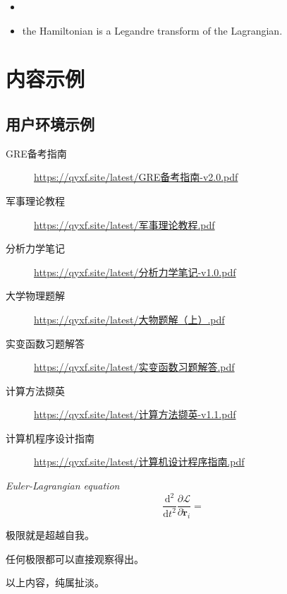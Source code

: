 \documentclass[
  10pt,
  twoside,
  openany,
  b5paper, %
  colorscheme = bootstrap-v4, %
]{qyxf-book}
\numberwithin{equation}{section}
\newcommand{\md}{\mathrm{d}}
\newcommand{\dd}[2]{\dfrac{\md^2 #1}{\md #2^2}}
\newcommand{\p}[2]{\dfrac{\partial #1}{\partial #2}}
\newcommand{\vr}{\boldsymbol{r}}
\newcommand{\dvr}{\dot{\vr}}
\newcommand{\lag}{\mathcal{L}} %
\begin{document}
\begin{itemize}
	\item 
	\item the Hamiltonian is a Legandre transform of the Lagrangian.
\end{itemize}








\chapter{内容示例}
\section{用户环境示例}

\begin{tcolorbox}
	\begin{description}
		\item [GRE备考指南] \url{https://qyxf.site/latest/GRE备考指南-v2.0.pdf}
		\item [军事理论教程] \url{https://qyxf.site/latest/军事理论教程.pdf}
		\item [分析力学笔记] \url{https://qyxf.site/latest/分析力学笔记-v1.0.pdf}
		\item [大学物理题解] \url{https://qyxf.site/latest/大物题解（上）.pdf}
		\item [实变函数习题解答] \url{https://qyxf.site/latest/实变函数习题解答.pdf}
		\item [计算方法撷英] \url{https://qyxf.site/latest/计算方法撷英-v1.1.pdf}
		\item [计算机程序设计指南] \url{https://qyxf.site/latest/计算机设计程序指南.pdf}
	\end{description}
\end{tcolorbox}

\begin{pequation}
	\textit{Euler-Lagrangian equation}
	$$
	\dd{}{t}\p{\lag}{\dvr_i}=
	$$
\end{pequation}

\begin{define}
  极限就是超越自我。
\end{define}

\begin{theorem}
  任何极限都可以直接观察得出。
\end{theorem}

\begin{lemma}
  以上内容，纯属扯淡。
\end{lemma}
\end{document}
